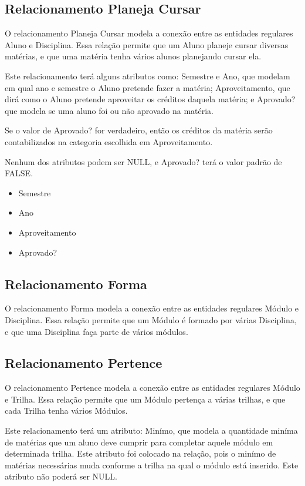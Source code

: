 \documentclass[a4paper]{article}
\begin{document}
\subsection*{Relacionamento Planeja Cursar}
O relacionamento Planeja Cursar modela a conexão entre as entidades regulares Aluno e
Disciplina. Essa relação permite que um Aluno planeje cursar diversas matérias,
e que uma matéria tenha vários alunos planejando cursar ela.

Este relacionamento terá alguns atributos como: Semestre e Ano, que modelam em
qual ano e semestre o Aluno pretende fazer a matéria; Aproveitamento, que dirá
como o Aluno pretende aproveitar os créditos daquela matéria; e Aprovado? que
modela se uma aluno foi ou não aprovado na matéria.

Se o valor de Aprovado? for verdadeiro, então os créditos da matéria serão
contabilizados na categoria escolhida em Aproveitamento.

Nenhum dos atributos podem ser NULL, e Aprovado? terá o valor padrão de FALSE.

\begin{itemize}
    \item Semestre
    \item Ano
    \item Aproveitamento
    \item Aprovado?
\end{itemize}

\subsection*{Relacionamento Forma}
O relacionamento Forma modela a conexão entre as entidades regulares Módulo e
Disciplina. Essa relação permite que um Módulo é formado por várias Disciplina,
e que uma Disciplina faça parte de vários módulos.

\subsection*{Relacionamento Pertence}
O relacionamento Pertence modela a conexão entre as entidades regulares Módulo e
Trilha. Essa relação permite que um Módulo pertença a várias trilhas, e que cada
Trilha tenha vários Módulos.

Este relacionamento terá um atributo: Minímo, que modela a quantidade miníma de
matérias que um aluno deve cumprir para completar aquele módulo em determinada
trilha. Este atributo foi colocado na relação, pois o minímo de matérias
necessárias muda conforme a trilha na qual o módulo está inserido. Este atributo
não poderá ser NULL.
\end{document}
